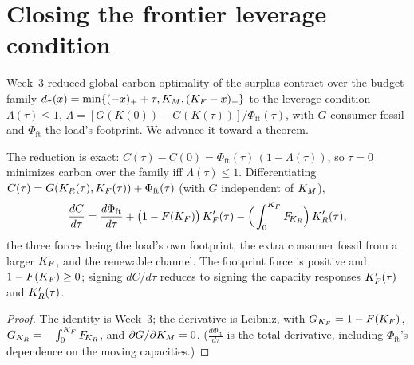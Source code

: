 \section{Closing the frontier leverage condition}\label{r1w4-sec:leverage}

Week~3 reduced global carbon-optimality of the surplus contract over the budget family
$d_\tau(x)=\min\{(-x)_++\tau,K_M,(K_F-x)_+\}$ to the leverage condition $\Lambda(\tau)\le1$,
$\Lambda=[G(K(0))-G(K(\tau))]/\Phi_{\mathrm{ft}}(\tau)$, with $G$ consumer fossil and
$\Phi_{\mathrm{ft}}$ the load's footprint. We advance it toward a theorem.

\begin{theorem}\label{r1w4-thm:leverage}
The reduction is exact: $C(\tau)-C(0)=\Phi_{\mathrm{ft}}(\tau)\,(1-\Lambda(\tau))$, so
$\tau=0$ minimizes carbon over the family iff $\Lambda(\tau)\le1$. Differentiating
$C(\tau)=G(K_R(\tau),K_F(\tau))+\Phi_{\mathrm{ft}}(\tau)$ (with $G$ independent of $K_M$),
\[
  \frac{dC}{d\tau}=\frac{d\Phi_{\mathrm{ft}}}{d\tau}
  +\big(1-F(K_F)\big)\,K_F'(\tau)-\Big(\int_0^{K_F}F_{\!K_R}\Big)\,K_R'(\tau),
\]
the three forces being the load's own footprint, the extra consumer fossil from a larger
$K_F$, and the renewable channel. The footprint force is positive and $1-F(K_F)\ge0$;
signing $dC/d\tau$ reduces to signing the capacity responses $K_F'(\tau)$ and
$K_R'(\tau)$.
\end{theorem}
\begin{proof}
The identity is Week~3; the derivative is Leibniz, with $G_{K_F}=1-F(K_F)$,
$G_{K_R}=-\int_0^{K_F}F_{\!K_R}$, and $\partial G/\partial K_M=0$. ($\tfrac{d\Phi_{\mathrm{ft}}}{d\tau}$
is the total derivative, including $\Phi_{\mathrm{ft}}$'s dependence on the moving
capacities.)
\end{proof}

